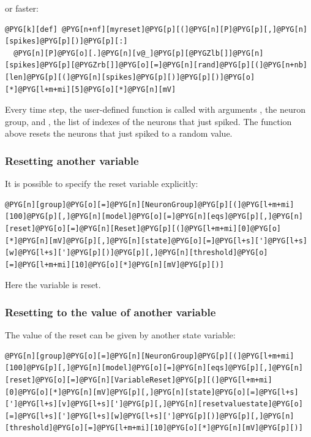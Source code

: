 \documentclass[letterpaper,10pt,english]{manual}
\begin{document}
or faster:

\begin{Verbatim}[commandchars=@\[\]]
@PYG[k][def] @PYG[n+nf][myreset]@PYG[p][(]@PYG[n][P]@PYG[p][,]@PYG[n][spikes]@PYG[p][)]@PYG[p][:]
  @PYG[n][P]@PYG[o][.]@PYG[n][v@_]@PYG[p][@PYGZlb[]]@PYG[n][spikes]@PYG[p][@PYGZrb[]]@PYG[o][=]@PYG[n][rand]@PYG[p][(]@PYG[n+nb][len]@PYG[p][(]@PYG[n][spikes]@PYG[p][)]@PYG[p][)]@PYG[o][*]@PYG[l+m+mi][5]@PYG[o][*]@PYG[n][mV]
\end{Verbatim}

Every time step, the user-defined function is called with arguments
, the neuron group, and , the list of indexes of the neurons that just spiked.
The function above resets the neurons that just spiked to a random value.


\subsubsection{Resetting another variable}

It is possible to specify the reset variable explicitly:

\begin{Verbatim}[commandchars=@\[\]]
@PYG[n][group]@PYG[o][=]@PYG[n][NeuronGroup]@PYG[p][(]@PYG[l+m+mi][100]@PYG[p][,]@PYG[n][model]@PYG[o][=]@PYG[n][eqs]@PYG[p][,]@PYG[n][reset]@PYG[o][=]@PYG[n][Reset]@PYG[p][(]@PYG[l+m+mi][0]@PYG[o][*]@PYG[n][mV]@PYG[p][,]@PYG[n][state]@PYG[o][=]@PYG[l+s][']@PYG[l+s][w]@PYG[l+s][']@PYG[p][)]@PYG[p][,]@PYG[n][threshold]@PYG[o][=]@PYG[l+m+mi][10]@PYG[o][*]@PYG[n][mV]@PYG[p][)]
\end{Verbatim}

Here the variable  is reset.


\subsubsection{Resetting to the value of another variable}

The value of the reset can be given by another state variable:

\begin{Verbatim}[commandchars=@\[\]]
@PYG[n][group]@PYG[o][=]@PYG[n][NeuronGroup]@PYG[p][(]@PYG[l+m+mi][100]@PYG[p][,]@PYG[n][model]@PYG[o][=]@PYG[n][eqs]@PYG[p][,]@PYG[n][reset]@PYG[o][=]@PYG[n][VariableReset]@PYG[p][(]@PYG[l+m+mi][0]@PYG[o][*]@PYG[n][mV]@PYG[p][,]@PYG[n][state]@PYG[o][=]@PYG[l+s][']@PYG[l+s][v]@PYG[l+s][']@PYG[p][,]@PYG[n][resetvaluestate]@PYG[o][=]@PYG[l+s][']@PYG[l+s][w]@PYG[l+s][']@PYG[p][)]@PYG[p][,]@PYG[n][threshold]@PYG[o][=]@PYG[l+m+mi][10]@PYG[o][*]@PYG[n][mV]@PYG[p][)]
\end{Verbatim}
\end{document}
